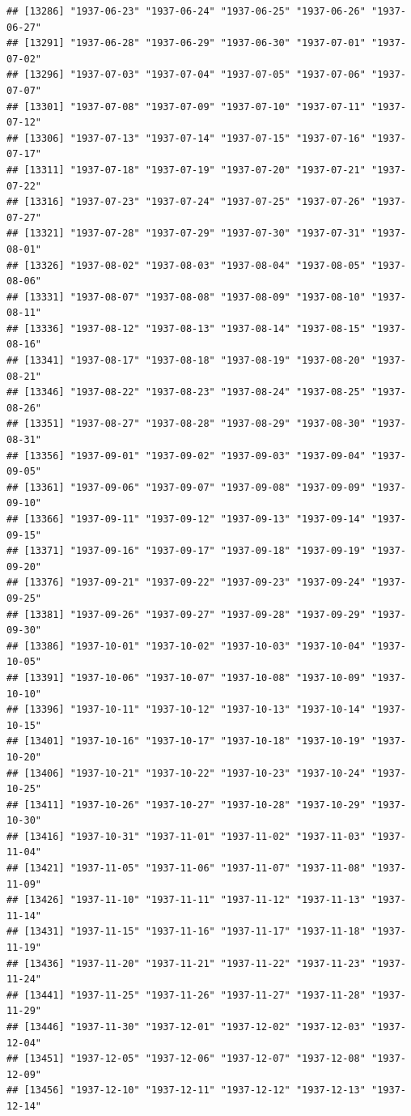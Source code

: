 \documentclass{article}\usepackage[]{graphicx}\usepackage[]{color}
\makeatletter
\newenvironment{kframe}{%
 \def\at@end@of@kframe{}%
 \ifinner\ifhmode%
  \def\at@end@of@kframe{\end{minipage}}%
  \begin{minipage}{\columnwidth}%
 \fi\fi%
 \def\FrameCommand##1{\hskip\@totalleftmargin \hskip-\fboxsep
 \colorbox{shadecolor}{##1}\hskip-\fboxsep
     \hskip-\linewidth \hskip-\@totalleftmargin \hskip\columnwidth}%
 \MakeFramed {\advance\hsize-\width
   \@totalleftmargin\z@ \linewidth\hsize
   \@setminipage}}%
 {\par\unskip\endMakeFramed%
 \at@end@of@kframe}
\newenvironment{knitrout}{}{} %
\makeatother
\begin{document}
\begin{description}
\begin{knitrout}
\begin{kframe}
\begin{verbatim}
## [13286] "1937-06-23" "1937-06-24" "1937-06-25" "1937-06-26" "1937-06-27"
## [13291] "1937-06-28" "1937-06-29" "1937-06-30" "1937-07-01" "1937-07-02"
## [13296] "1937-07-03" "1937-07-04" "1937-07-05" "1937-07-06" "1937-07-07"
## [13301] "1937-07-08" "1937-07-09" "1937-07-10" "1937-07-11" "1937-07-12"
## [13306] "1937-07-13" "1937-07-14" "1937-07-15" "1937-07-16" "1937-07-17"
## [13311] "1937-07-18" "1937-07-19" "1937-07-20" "1937-07-21" "1937-07-22"
## [13316] "1937-07-23" "1937-07-24" "1937-07-25" "1937-07-26" "1937-07-27"
## [13321] "1937-07-28" "1937-07-29" "1937-07-30" "1937-07-31" "1937-08-01"
## [13326] "1937-08-02" "1937-08-03" "1937-08-04" "1937-08-05" "1937-08-06"
## [13331] "1937-08-07" "1937-08-08" "1937-08-09" "1937-08-10" "1937-08-11"
## [13336] "1937-08-12" "1937-08-13" "1937-08-14" "1937-08-15" "1937-08-16"
## [13341] "1937-08-17" "1937-08-18" "1937-08-19" "1937-08-20" "1937-08-21"
## [13346] "1937-08-22" "1937-08-23" "1937-08-24" "1937-08-25" "1937-08-26"
## [13351] "1937-08-27" "1937-08-28" "1937-08-29" "1937-08-30" "1937-08-31"
## [13356] "1937-09-01" "1937-09-02" "1937-09-03" "1937-09-04" "1937-09-05"
## [13361] "1937-09-06" "1937-09-07" "1937-09-08" "1937-09-09" "1937-09-10"
## [13366] "1937-09-11" "1937-09-12" "1937-09-13" "1937-09-14" "1937-09-15"
## [13371] "1937-09-16" "1937-09-17" "1937-09-18" "1937-09-19" "1937-09-20"
## [13376] "1937-09-21" "1937-09-22" "1937-09-23" "1937-09-24" "1937-09-25"
## [13381] "1937-09-26" "1937-09-27" "1937-09-28" "1937-09-29" "1937-09-30"
## [13386] "1937-10-01" "1937-10-02" "1937-10-03" "1937-10-04" "1937-10-05"
## [13391] "1937-10-06" "1937-10-07" "1937-10-08" "1937-10-09" "1937-10-10"
## [13396] "1937-10-11" "1937-10-12" "1937-10-13" "1937-10-14" "1937-10-15"
## [13401] "1937-10-16" "1937-10-17" "1937-10-18" "1937-10-19" "1937-10-20"
## [13406] "1937-10-21" "1937-10-22" "1937-10-23" "1937-10-24" "1937-10-25"
## [13411] "1937-10-26" "1937-10-27" "1937-10-28" "1937-10-29" "1937-10-30"
## [13416] "1937-10-31" "1937-11-01" "1937-11-02" "1937-11-03" "1937-11-04"
## [13421] "1937-11-05" "1937-11-06" "1937-11-07" "1937-11-08" "1937-11-09"
## [13426] "1937-11-10" "1937-11-11" "1937-11-12" "1937-11-13" "1937-11-14"
## [13431] "1937-11-15" "1937-11-16" "1937-11-17" "1937-11-18" "1937-11-19"
## [13436] "1937-11-20" "1937-11-21" "1937-11-22" "1937-11-23" "1937-11-24"
## [13441] "1937-11-25" "1937-11-26" "1937-11-27" "1937-11-28" "1937-11-29"
## [13446] "1937-11-30" "1937-12-01" "1937-12-02" "1937-12-03" "1937-12-04"
## [13451] "1937-12-05" "1937-12-06" "1937-12-07" "1937-12-08" "1937-12-09"
## [13456] "1937-12-10" "1937-12-11" "1937-12-12" "1937-12-13" "1937-12-14"

\end{verbatim}
\end{kframe}
\end{knitrout}
\end{description}
\end{document}
